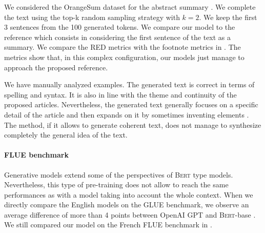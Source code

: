 We considered the OrangeSum dataset for the abstract summary \parencite{kamal_20}. We complete the text using the top-k random sampling strategy \parencite{lewis_18} with $k=2$. We keep the first 3 sentences from the 100 generated tokens. We compare our model to the reference which consists in considering the first sentence of the text as a summary. We compare the RED metrics with the footnote metrics \parencite{lin2004rouge} in . The metrics show that, in this complex configuration, our models just manage to approach the proposed reference. 

We have manually analyzed examples. The generated text is correct in terms of spelling and syntax. It is also in line with the theme and continuity of the proposed articles. Nevertheless, the generated text generally focuses on a specific detail of the article and then expands on it by sometimes inventing elements \parencite{kryscinski_19}. The method, if it allows to generate coherent text, does not manage to synthesize completely the general idea of the text.

\paragraph{FLUE benchmark} Generative models extend some of the perspectives of \textsc{Bert} type models. Nevertheless, this type of pre-training does not allow to reach the same performances as with a model taking into account the whole context. When we directly compare the English models on the GLUE benchmark, we observe an average difference of more than 4 points between OpenAI GPT and \textsc{Bert}-base \parencite{radford_2018}. We still compared our model on the French FLUE benchmark in .

